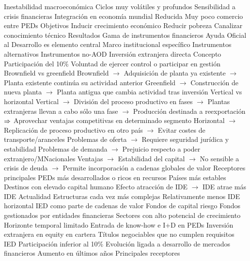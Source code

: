 \documentclass{nuevotema}
\begin{document}
\begin{esquemal}
				\4 Inestabilidad macroeconómica
				\4[] Ciclos muy volátiles y profundos
				\4[] Sensibilidad a crisis financieras
				\4 Integración en economía mundial
				\4[] Reducida
				\4[] Muy poco comercio entre PEDs
			\3 Objetivos
				\4 Inducir crecimiento económico
				\4 Reducir pobreza
				\4 Canalizar conocimiento técnico
			\3 Resultados
				\4 Gama de instrumentos financieros
				\4 Ayuda Oficial al Desarrollo es elemento central
				\4 Marco institucional específico
				\4 Instrumentos alternativos
		\2 Instrumentos no-AOD
			\3 Inversión extranjera directa
				\4 Concepto
				\4[] Participación del 10\%
				\4[] Voluntad de ejercer control o participar en gestión
				\4 Brownfield vs greenfield
				\4[] Brownfield
				\4[] $\to$ Adquisición de planta ya existente
				\4[] $\to$ Planta existente continúa su actividad anterior
				\4[] Greenfield
				\4[] $\to$ Construcción de nueva planta
				\4[] $\to$ Planta antigua que cambia actividad tras inversión
				\4 Vertical vs horizontal
				\4[] Vertical
				\4[] $\to$ División del proceso productivo en fases
				\4[] $\to$ Plantas extranjeras llevan a cabo sólo una fase
				\4[] $\to$ Producción destinada a reexportación
				\4[] $\Rightarrow$ Aprovechar ventajas competitivas en determinado segmento
				\4[] Horizontal
				\4[] $\to$ Replicación de proceso productivo en otro país
				\4[] $\to$ Evitar costes de transporte/aranceles
				\4 Problemas de oferta
				\4[] $\to$ Requiere seguridad jurídica y estabilidad
				\4 Problemas de demanda
				\4[] $\to$ Prejuicio respecto a poder extranjero/MNacionales
				\4 Ventajas
				\4[] $\to$ Estabilidad del capital
				\4[] $\to$ No sensible a crisis de deuda
				\4[] $\to$ Permite incorporación a cadenas globales de valor
				\4 Receptores principales
				\4[] PEDs más desarrollados o ricos en recursos
				\4[] Países más estables
				\4[] Destinos con elevado capital humano
				\4 Efecto atracción de IDE
				\4[] $\to$ IDE atrae más IDE
				\4 Actualidad
				\4[] Estructuras cada vez más complejas
				\4[] Relativamente menos IDE horizontal
				\4[] IED como parte de cadenas de valor
				\4 Fondos de capital riesgo
				\4[] Fondos gestionados por entidades financieras
				\4[] Sectores con alto potencial de crecimiento
				\4[] Horizonte temporal limitado
				\4[] Entrada de know-how e I+D en PEDs
			\3 Inversión extranjera en equity en cartera
				\4 Títulos negociables que no cumplen requisitos IED
				\4[] Participación inferior al 10\%
				\4 Evolución ligada a desarrollo de mercados financieros
				\4[] Aumento en últimos años
				\4 Principales receptores

\end{esquemal}
\end{document}
